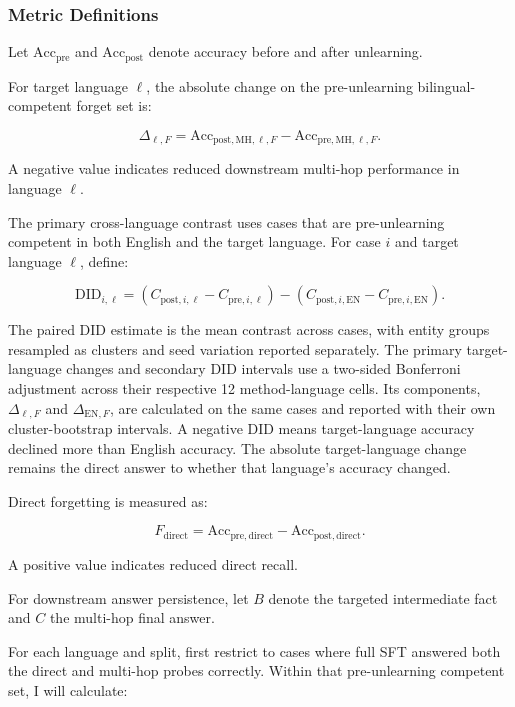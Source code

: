 \documentclass[10pt,a4paper]{article}
\begin{document}
\subsubsection*{Metric Definitions}

Let $\mathrm{Acc}_{\mathrm{pre}}$ and
$\mathrm{Acc}_{\mathrm{post}}$ denote accuracy before
and after unlearning.

For target language $\ell$, the absolute change on the
pre-unlearning bilingual-competent forget set is:

\[
\Delta_{\ell,F} =
\mathrm{Acc}_{\mathrm{post,MH},\ell,F}
-
\mathrm{Acc}_{\mathrm{pre,MH},\ell,F}.
\]

A negative value indicates reduced downstream
multi-hop performance in language $\ell$.

The primary cross-language contrast uses cases that are
pre-unlearning competent in both English and the target
language. For case $i$ and target language $\ell$, define:

\[
\mathrm{DID}_{i,\ell} =
\left(C_{\mathrm{post},i,\ell} - C_{\mathrm{pre},i,\ell}\right)
-
\left(C_{\mathrm{post},i,\mathrm{EN}} - C_{\mathrm{pre},i,\mathrm{EN}}\right).
\]

The paired DID estimate is the mean contrast across cases,
with entity groups resampled as clusters and seed variation
reported separately. The primary target-language changes
and secondary DID intervals use a two-sided Bonferroni
adjustment across their respective 12 method-language cells.
Its components, $\Delta_{\ell,F}$ and
$\Delta_{\mathrm{EN},F}$, are calculated on the same cases
and reported with their own cluster-bootstrap intervals.
A negative DID means target-language accuracy declined
more than English accuracy. The absolute target-language
change remains the direct answer to whether that language's
accuracy changed.

Direct forgetting is measured as:

\[
F_{\mathrm{direct}} =
\mathrm{Acc}_{\mathrm{pre,direct}}
-
\mathrm{Acc}_{\mathrm{post,direct}}.
\]

A positive value indicates reduced direct recall.

For downstream answer persistence, let $B$ denote
the targeted intermediate fact and $C$ the
multi-hop final answer.

For each language and split, first restrict to cases
where full SFT answered both the direct and multi-hop
probes correctly. Within that pre-unlearning competent
set, I will calculate:
\end{document}
